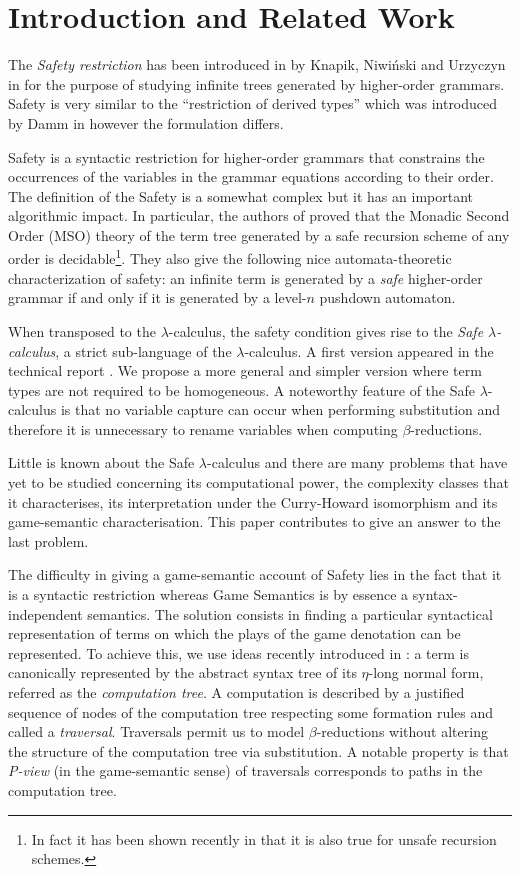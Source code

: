 \documentclass{llncs}
\begin{document}
\section{Introduction and Related Work}

The \emph{Safety restriction} has been introduced in by Knapik, Niwi{\'n}ski and Urzyczyn in \cite{KNU02}
for the purpose of studying infinite trees generated by higher-order grammars.
Safety is very similar to the ``restriction of derived types'' which was introduced
by Damm in \cite{Dam82} however the formulation differs.

Safety is a syntactic restriction for higher-order grammars that
constrains the occurrences of the variables in the grammar
equations according to their order.
The definition of the Safety is a somewhat complex but it has an important algorithmic impact.
In particular, the authors of \cite{KNU02} proved that the Monadic Second
Order (MSO) theory of the term tree generated by a safe recursion
scheme of any order is decidable\footnote{In fact it has been shown
recently in \cite{OngLics2006} that it is also true for unsafe
recursion schemes.}. They also give the following nice automata-theoretic characterization of safety:
an infinite term is generated by a \emph{safe} higher-order grammar if and only if
it is generated by a level-$n$ pushdown automaton.


When transposed to the $\lambda$-calculus, the safety condition
gives rise to the \emph{Safe $\lambda$-calculus}, a strict
sub-language of the $\lambda$-calculus. A first version appeared in
the technical report \cite{safety-mirlong2004}. We propose a more
general and simpler version where term types are not required to be
homogeneous. A noteworthy feature of the Safe
$\lambda$-calculus is that no variable capture can occur when
performing substitution and therefore it is unnecessary to rename
variables when computing $\beta$-reductions.

Little is known about the Safe $\lambda$-calculus and there are many
problems that have yet to be studied concerning its
computational power, the complexity classes that it characterises,
its interpretation under the Curry-Howard isomorphism and its
game-semantic characterisation. This paper contributes to give an
answer to the last problem.


The difficulty in giving a game-semantic account of Safety lies in
the fact that it is a syntactic restriction whereas Game Semantics
is by essence a syntax-independent semantics. The solution consists
in finding a particular syntactical representation of terms on which
the plays of the game denotation can be represented.
To achieve this, we use ideas recently introduced in \cite{OngLics2006}: a term
is canonically represented by the abstract syntax tree of its
$\eta$-long normal form, referred as the \emph{computation tree}. A
computation is described by a justified sequence of nodes of the
computation tree respecting some formation rules and called a
\emph{traversal}. Traversals permit us to model $\beta$-reductions
without altering the structure of the computation tree via
substitution. A notable property is that \emph{P-view} (in the game-semantic sense) of traversals
corresponds to paths in the computation tree.
\end{document}
